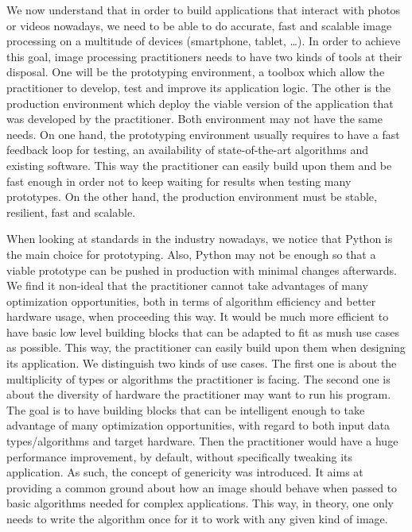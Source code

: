 We now understand that in order to build applications that interact with photos or videos nowadays, we need to be able
to do accurate, fast and scalable image processing on a multitude of devices (smartphone, tablet, \ldots). In order to
achieve this goal, image processing practitioners needs to have two kinds of tools at their disposal. One will be the
prototyping environment, a toolbox which allow the practitioner to develop, test and improve its application logic.
The other is the production environment which deploy the viable version of the application that was developed by the
practitioner. Both environment may not have the same needs. On one hand, the prototyping environment usually requires to
have a fast feedback loop for testing, an availability of state-of-the-art algorithms and existing software. This way
the practitioner can easily build upon them and be fast enough in order not to keep waiting for results when testing
many prototypes. On the other hand, the production environment must be stable, resilient, fast and scalable.

When looking at standards in the industry nowadays, we notice that Python is the main choice for prototyping. Also,
Python may not be enough so that a viable prototype can be pushed in production with minimal changes afterwards. We find
it non-ideal that the practitioner cannot take advantages of many optimization opportunities, both in terms of algorithm
efficiency and better hardware usage, when proceeding this way. It would be much more efficient to have basic low level
building blocks that can be adapted to fit as mush use cases as possible. This way, the practitioner can easily build
upon them when designing its application. We distinguish two kinds of use cases. The first one is about the multiplicity
of types or algorithms the practitioner is facing. The second one is about the diversity of hardware the practitioner
may want to run his program. The goal is to have building blocks that can be intelligent enough to take advantage of
many optimization opportunities, with regard to both input data types/algorithms and target hardware. Then the
practitioner would have a huge performance improvement, by default, without specifically tweaking its application. As
such, the concept of genericity was introduced. It aims at providing a common ground about how an image should behave
when passed to basic algorithms needed for complex applications. This way, in theory, one only needs to write the
algorithm once for it to work with any given kind of image.


